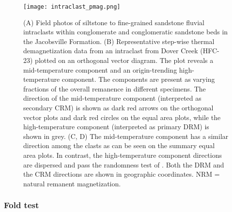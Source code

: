 \documentclass[draft]{agujournal2019}
\begin{document}
\begin{figure}[h!]
\centering
\texttt{[image: intraclast\_pmag.png]}
\caption{\scriptsize(A) Field photos of siltstone to fine-grained sandstone fluvial intraclasts within conglomerate and conglomeratic sandstone beds in the Jacobsville Formation. (B) Representative step-wise thermal demagnetization data from an intraclast from Dover Creek (HFC-23) plotted on an orthogonal vector diagram. The plot reveals a mid-temperature component and an origin-trending high-temperature component. The components are present as varying fractions of the overall remanence in different specimens. The direction of the mid-temperature component (interpreted as secondary CRM) is shown as dark red arrows on the orthogonal vector plots and dark red circles on the equal area plots, while the high-temperature component (interpreted as primary DRM) is shown in grey. (C, D) The mid-temperature component has a similar direction among the clasts as can be seen on the summary equal area plots. In contrast, the high-temperature component directions are dispersed and pass the randomness test of . Both the DRM and the CRM directions are shown in geographic coordinates. NRM = natural remanent magnetization.}
\label{fig:intraclast_pmag}
\end{figure}

\subsubsection*{Fold test}
\end{document}
